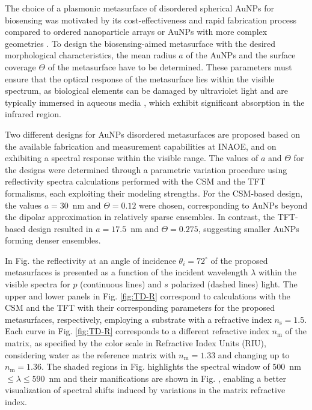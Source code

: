 
The choice of a plasmonic metasurface of disordered spherical AuNPs for biosensing was motivated by its cost-effectiveness and rapid fabrication process compared to ordered nanoparticle arrays or AuNPs with more complex geometries \cite{estevez_trends_2014,kabashin_label-free_2023}. To design the biosensing-aimed metasurface with the desired morphological characteristics, the mean radius $a$ of the AuNPs and the surface coverage $\Theta$ of the metasurface have to be determined. These parameters  must ensure that the optical response of the metasurface lies within the visible spectrum, as biological elements can be damaged by ultraviolet light and are typically immersed in aqueous media \cite{estevez_trends_2014}, which exhibit significant absorption in the infrared region.


Two different designs for AuNPs disordered metasurfaces are proposed based  on the available fabrication and measurement capabilities at INAOE, and on exhibiting a spectral response within the visible range. The values of $a$ and $\Theta$ for the designs were determined through a parametric variation procedure using reflectivity spectra calculations performed with the CSM and the TFT formalisms, each exploiting their modeling strengths. For the CSM-based design, the values $a = 30$~nm and $\Theta = 0.12$ were chosen, corresponding to AuNPs beyond the dipolar approximation in relatively sparse  ensembles. In contrast, the TFT-based  design resulted in $a=17.5$~nm and $\Theta=0.275$, suggesting smaller AuNPs forming denser ensembles.

In Fig.  the reflectivity  at an angle of incidence $\theta_i = 72^\circ$ of the proposed metasurfaces is presented as a function of the incident wavelength $\lambda$ within the visible spectra for $p$ (continuous lines)  and $s$ polarized (dashed lines) light. The upper and lower panels in Fig. \ref{fig:TD-R} correspond to calculations with the CSM and the TFT with their corresponding parameters for the proposed metasurfaces, respectively, employing a substrate with a refractive index $n_\text{s} = 1.5$. Each curve in Fig. \ref{fig:TD-R} corresponds to a different refractive index $n_\text{m}$ of the matrix, as specified by the color scale in Refractive Index Units (RIU), considering  water as the reference matrix with $n_\text{m} = 1.33$ and changing up to $n_\text{m} = 1.36$. The shaded regions in Fig.  highlights the spectral window of $500$~nm $\leq \lambda \leq 590$~nm and their manifications are shown in Fig.  , enabling a better visualization of spectral shifts induced by variations in the matrix refractive index.

